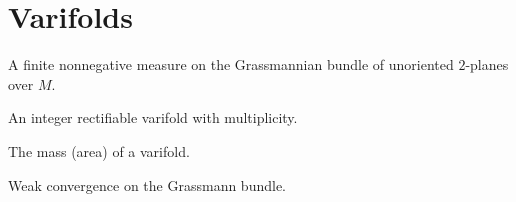 \chapter{Varifolds}

\begin{definition}[Varifold]\label{def:varifold}
A finite nonnegative measure on the Grassmannian bundle of unoriented $2$-planes over $M$. \uses{}
\end{definition}

\begin{definition}\label{def:int-varifold}
An integer rectifiable varifold with multiplicity. \uses{}
\end{definition}

\begin{definition}[Mass]\label{def:mass}
The mass (area) of a varifold. \uses{}
\end{definition}

\begin{definition}\label{def:varifold-conv}
Weak convergence on the Grassmann bundle. \uses{}
\end{definition}
